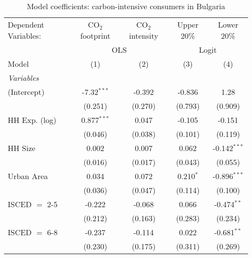 
\begin{table}[htbp!]
   \centering
   \small
   \begin{adjustbox}{width = 1\textwidth, max height = 0.95\textheight, center}
      \begin{threeparttable}[b]
         \caption{\label{tab:Logit_1_BGR} Model coefficients: carbon-intensive consumers in Bulgaria}
         \begin{tabular}{lcccc}
            \tabularnewline \midrule \midrule
            Dependent Variables: & CO$_{2}$ footprint & CO$_{2}$ intensity & Upper 20\%  & Lower 20\%\\   
             & \multicolumn{2}{c}{OLS} & \multicolumn{2}{c}{Logit} \\ 
            Model                & (1)                & (2)                & (3)         & (4)\\  
            \midrule
            \emph{Variables}\\
            (Intercept)          & -7.32$^{***}$      & -0.392             & -0.836      & 1.28\\   
                                 & (0.251)            & (0.270)            & (0.793)     & (0.909)\\   
            HH Exp. (log)        & 0.877$^{***}$      & 0.047              & -0.105      & -0.151\\   
                                 & (0.046)            & (0.038)            & (0.101)     & (0.119)\\   
            HH Size              & 0.002              & 0.007              & 0.062       & -0.142$^{***}$\\   
                                 & (0.016)            & (0.017)            & (0.043)     & (0.055)\\   
            Urban Area           & 0.034              & 0.072              & 0.210$^{*}$ & -0.896$^{***}$\\   
                                 & (0.036)            & (0.047)            & (0.114)     & (0.100)\\   
            ISCED $=$ 2-5        & -0.222             & -0.068             & 0.066       & -0.474$^{**}$\\   
                                 & (0.212)            & (0.163)            & (0.283)     & (0.234)\\   
            ISCED $=$ 6-8        & -0.237             & -0.114             & 0.022       & -0.681$^{**}$\\   
                                 & (0.230)            & (0.175)            & (0.311)     & (0.269)\\   

\end{tabular}
\end{threeparttable}
\end{adjustbox}
\end{table}
